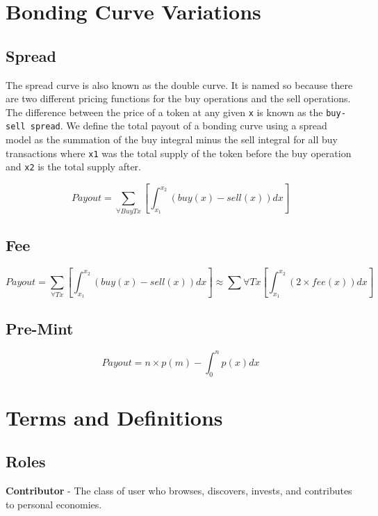 \documentclass[a4paper, 10pt]{article}
\begin{document}
\begin{appendices}

\section{Bonding Curve Variations}

\subsection{Spread}

The spread curve is also known as the double curve. It is named so because there are two different pricing functions for the buy operations and the sell operations. The difference between the price of a token at any given \texttt{x} is known as the \texttt{buy-sell spread}. We define the total payout of a bonding curve using a spread model as the summation of the buy integral minus the sell integral for all buy transactions where \texttt{x1} was the total supply of the token before the buy operation and \texttt{x2} is the total supply after.

\[Payout = \sum_{\forall BuyTx} \left [ \int_{x_{1}}^{x_{2}}(buy(x)-sell(x))dx \right ]\]

\subsection{Fee}

\[Payout = \sum_{\forall Tx} \left [ \int_{x_{1}}^{x_{2}}(buy(x)-sell(x))dx \right ] \approx \sum{\forall Tx} \left [ \int_{x_{1}}^{x_{2}}(2 \times fee(x))dx \right ]\]

\subsection{Pre-Mint}

\[Payout = n \times p(m) - \int_{0}^{n} p(x) dx\]

\section{Terms and Definitions}

\subsection{Roles}

\textbf{Contributor} - The class of user who browses, discovers, invests, and contributes to personal economies. 
\medskip


\end{appendices}
\end{document}
